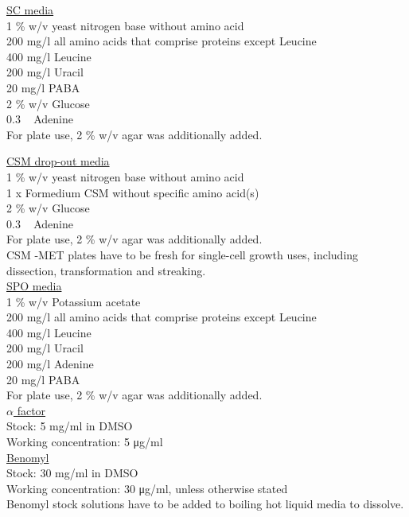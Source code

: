 \underline{SC media} \\
1 \% w/v yeast nitrogen base without amino acid \\
200 \si{\milli\gram/\litre} all amino acids that comprise proteins except Leucine \\
400 \si{\milli\gram/\litre} Leucine \\
200 \si{\milli\gram/\litre} Uracil \\
20 \si{\milli\gram/\litre} PABA \\
2 \% w/v Glucose \\ 
0.3 \si{\milli\Molar} Adenine\\
For plate use, 2 \% w/v agar was additionally added. \\


\underline{CSM drop-out media} \\
1 \% w/v yeast nitrogen base without amino acid \\
1 x Formedium CSM without specific amino acid(s)\\
2 \% w/v Glucose \\ 
0.3 \si{\milli\Molar} Adenine\\
For plate use, 2 \% w/v agar was additionally added. \\
CSM -MET plates have to be fresh for single-cell growth uses, including dissection, transformation and streaking. \\

\underline{SPO media}\\
1 \% w/v Potassium acetate\\
200 \si{\milli\gram/\litre} all amino acids that comprise proteins except Leucine \\
400 \si{\milli\gram/\litre} Leucine \\
200 \si{\milli\gram/\litre} Uracil \\
200 \si{\milli\gram/\litre} Adenine\\
20 \si{\milli\gram/\litre} PABA \\
For plate use, 2 \% w/v agar was additionally added. \\

\underline{$\alpha$ factor}\\
Stock: 5 \si{\milli\gram/\milli\litre} in DMSO \\
Working concentration: 5 \si{\micro\gram/\milli\litre}\\

\underline{Benomyl} \\
Stock: 30 \si{\milli\gram/\milli\litre} in DMSO \\ 
Working concentration: 30 \si{\micro\gram/\milli\litre}, unless otherwise stated \\
Benomyl stock solutions have to be added to boiling hot liquid media to dissolve. \\


